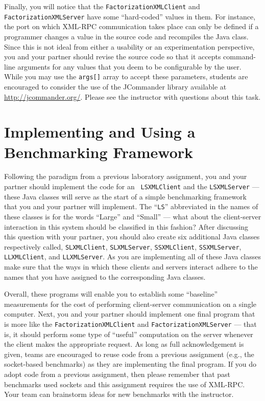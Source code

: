 Finally, you will notice that the {\tt FactorizationXMLClient} and {\tt FactorizationXMLServer} have some ``hard-coded''
values in them. For instance, the port on which XML-RPC communication takes place can only be defined if a programmer
changes a value in the source code and recompiles the Java class. Since this is not ideal from either a usability or an
experimentation perspective, you and your partner should revise the source code so that it accepts command-line
arguments for any values that you deem to be configurable by the user. While you may use the {\tt args[]} array to
accept these parameters, students are encouraged to consider the use of the JCommander library available at
\url{http://jcommander.org/}. Please see the instructor with questions about this task.

\section*{Implementing and Using a Benchmarking Framework}

Following the paradigm from a previous laboratory assignment, you and your partner should implement the code for an {\tt
LSXMLClient} and the {\tt LSXMLServer} --- these Java classes will serve as the start of a simple benchmarking framework
that you and your partner will implement. The ``{\tt LS}'' abbreviated in the names of these classes is for the words
``Large'' and ``Small'' --- what about the client-server interaction in this system should be classified in this
fashion?  After discussing this question with your partner, you should also create six additional Java classes
respectively called, {\tt SLXMLClient}, {\tt SLXMLServer}, {\tt SSXMLClient}, {\tt SSXMLServer}, {\tt LLXMLClient}, and
{\tt LLXMLServer}. As you are implementing all of these Java classes make sure that the ways in which these clients and
servers interact adhere to the names that you have assigned to the corresponding Java classes.

Overall, these programs will enable you to establish some ``baseline'' measurements for the cost of performing
client-server communication on a single computer.  Next, you and your partner should implement one final program that is
more like the {\tt FactorizationXMLClient} and {\tt FactorizationXMLServer} --- that is, it should perform some type of
``useful'' computation on the server whenever the client makes the appropriate request. As long as full acknowledgement
is given, teams are encouraged to reuse code from a previous assignment (e.g., the socket-based benchmarks) as they are
implementing the final program. If you do adopt code from a previous assignment, then please remember that past
benchmarks used sockets and this assignment requires the use of XML-RPC.  Your team can brainstorm ideas for new
benchmarks with the instructor.

